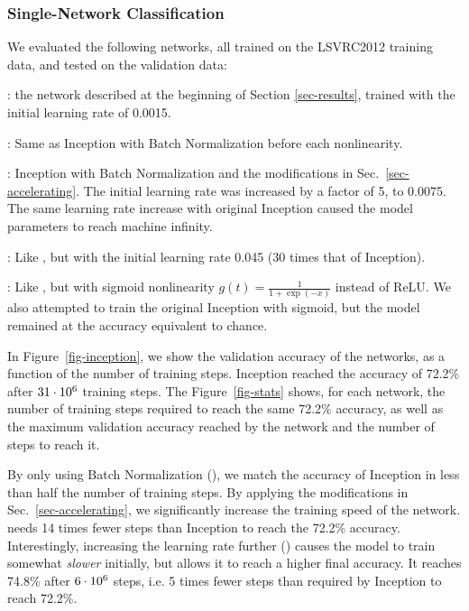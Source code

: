 \documentclass[twocolumn]{article}
\begin{document}
\subsubsection{Single-Network Classification}

We evaluated the following networks, all trained on the LSVRC2012 training data, and tested on the validation data:


: the network described at the beginning of Section \ref{sec-results}, trained with the initial learning rate of 0.0015.

: Same as Inception with Batch Normalization before each nonlinearity.

: Inception with Batch Normalization and the modifications  in Sec.~\ref{sec-accelerating}. The initial learning rate was increased by a factor of 5, to 0.0075. The same learning rate increase with original Inception caused the model parameters to reach machine infinity.

: Like , but with the initial learning rate  0.045 (30 times that of Inception).

: Like , but with sigmoid nonlinearity $g(t)=\frac{1}{1+\exp(-x)}$ instead of ReLU.
We also attempted to train the original Inception with sigmoid, but the model remained at the  accuracy equivalent to chance.

In Figure~\ref{fig-inception}, we show the validation accuracy of the
networks, as a function of the number of training steps.  Inception
reached the accuracy of 72.2\% after $31\cdot 10^6$ training steps. The
Figure~\ref{fig-stats} shows, for each network, the number of training
steps required to reach the same 72.2\% accuracy, as well as the
maximum validation accuracy reached by the network and the number of steps
to reach it.
 
By only using Batch Normalization (), we match the accuracy of Inception in less than half the number of training steps. By applying the modifications in Sec.~\ref{sec-accelerating}, we significantly increase the training speed of the network.  needs 14 times fewer steps than Inception to reach the 72.2\% accuracy.
Interestingly, increasing the learning rate further ()  causes the model to train somewhat {\em slower} initially, but allows it to reach a higher final accuracy. It  reaches  74.8\% after $6\cdot 10^6$ steps, i.e. 5 times fewer steps than required by Inception to reach 72.2\%.
\end{document}
